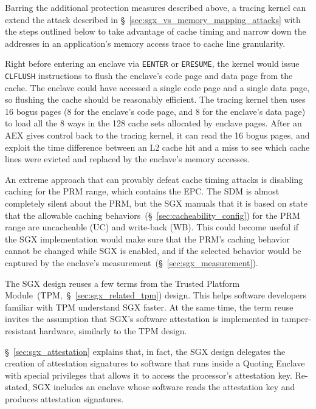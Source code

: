 Barring the additional protection measures described above, a tracing kernel
can extend the attack described in \S~\ref{sec:sgx_vs_memory_mapping_attacks}
with the steps outlined below to take advantage of cache timing and narrow down the
addresses in an application's memory access trace to cache line granularity.

Right before entering an enclave via \texttt{EENTER} or \texttt{ERESUME}, the
kernel would issue \texttt{CLFLUSH} instructions to flush the enclave's code
page and data page from the cache. The enclave could have accessed a single
code page and a single data page, so flushing the cache should be reasonably
efficient. The tracing kernel then uses 16 bogus pages (8 for the enclave's
code page, and 8 for the enclave's data page) to load all the 8 ways in the 128
cache sets allocated by enclave pages. After an AEX gives control back to the
tracing kernel, it can read the 16 bogus pages, and exploit the time difference
between an L2 cache hit and a miss to see which cache lines were evicted and
replaced by the enclave's memory accesses.



An extreme approach that can provably defeat cache timing attacks is disabling
caching for the PRM range, which contains the EPC. The SDM is almost completely
silent about the PRM, but the SGX manuals that it is based on state that
the allowable caching behaviors~(\S~\ref{sec:cacheability_config}) for the PRM
range are uncacheable (UC) and write-back (WB). This could become useful if the
SGX implementation would make sure that the PRM's caching behavior cannot be
changed while SGX is enabled, and if the selected behavior would be captured by
the enclave's measurement~(\S~\ref{sec:sgx_measurement}).



The SGX design reuses a few terms from the Trusted Platform
Module~(TPM,~\S~\ref{sec:sgx_related_tpm}) design. This helps software
developers familiar with TPM understand SGX faster. At the same time, the term
reuse invites the assumption that SGX's software attestation is implemented in
tamper-resistant hardware, similarly to the TPM design.

\S~\ref{sec:sgx_attestation} explains that, in fact, the SGX design delegates
the creation of attestation signatures to software that runs inside a
Quoting Enclave with special privileges that allows it to access the
processor's attestation key. Re-stated, SGX includes an enclave whose
software reads the attestation key and produces attestation signatures.

